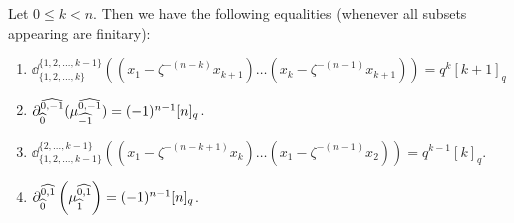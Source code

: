 \begin{lemma}\label{lemma demazure adjacent} Let $0\leq k<n$. Then we have the following equalities (whenever all subsets appearing are finitary):  
    \begin{enumerate}
        \item[(a)]   \hfill$ \dd_{\{1,2, \ldots ,k\}}^{\{1,2, \ldots ,k-1\}}\left((x_1-\zeta^{-(n-k)}x_{k+1})\ldots (x_{k}-\zeta^{-(n-1)}x_{k+1})\right)=q^{k}[k+1]_q$ \hfill \null
        \item[(b)] \hfill $\partial^{\widehat{0,-1}}_{\widehat{0}}(\mu^{\widehat{0,-1}}_{\widehat{-1}}) =(-1)^{n-1}[n]_q$. \hfill \null
        \item[(c)]  \hfill $\dd_{\{1,2, \ldots ,k-1\}}^{\{2, \ldots ,k-1\}}\left((x_1-\zeta^{-(n-k+1)}x_k)\ldots (x_1-\zeta^{-(n-1)}x_2)\right)=q^{k-1}[k]_q.$ \hfill \null\label{lemma demazure for bigon}
        \item[(d)] \hfill $ \partial_{\widehat{0}}^{\widehat{0,1}}\left(\mu^{\widehat{0,1}}_{\widehat{1}} \right)= (-1)^{n-1}[n]_q$. \hfill \null
    \end{enumerate}
\end{lemma}
